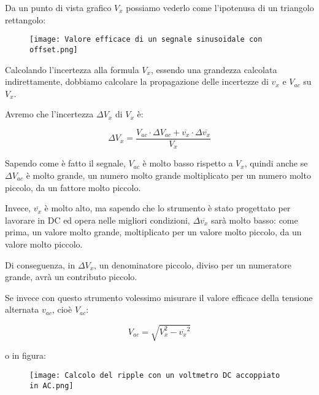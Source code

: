 Da un punto di vista grafico $V_x$ possiamo vederlo come l'ipotenusa di un triangolo rettangolo: 

\begin{figure}[h]
    \centering
    \texttt{[image: Valore efficace di un segnale sinusoidale con offset.png]}
\end{figure}

Calcolando l'incertezza alla formula $V_x$, essendo una grandezza calcolata indirettamente, 
dobbiamo calcolare la propagazione delle incertezze di $v_x$ e $V_{ac}$ su $V_x$. \newline 

Avremo che l'incertezza $\Delta V_x$ di $V_x$ è: 

{
    \Large 
    \begin{equation}
        \Delta V_x
        = 
        \frac{V_{ac} \cdot \Delta V_{ac} + \overline{v_x} \cdot \Delta \overline{v_x}}{V_x}
    \end{equation}
}

Sapendo come è fatto il segnale, $V_{ac}$ è molto basso rispetto a $V_x$, quindi anche se $\Delta V_{ac}$ è molto grande, 
un numero molto grande moltiplicato per un numero molto piccolo, da un fattore molto piccolo. \newline 

Invece, $\overline{v_x}$ è molto alto, ma sapendo che lo strumento è stato progettato per lavorare in DC ed opera nelle migliori condizioni, 
$\Delta \overline{v_x}$ sarà molto basso: come prima, un valore molto grande, moltiplicato per un valore molto piccolo, da un valore molto piccolo. \newline 

Di conseguenza, in $\Delta V_x$, un denominatore piccolo, diviso per un numeratore grande, avrà un contributo piccolo. \newline 

Se invece con questo strumento volessimo misurare il valore efficace della tensione alternata $v_{ac}$, cioè $V_{ac}$: 

{
    \Large 
    \begin{equation}
        V_{ac}
        = 
        \sqrt{V_x ^{2} - \overline{v_x}^{2}}
    \end{equation}
}

o in figura: 

\begin{figure}[h]
    \centering
    \texttt{[image: Calcolo del ripple con un voltmetro DC accoppiato in AC.png]}
\end{figure}


